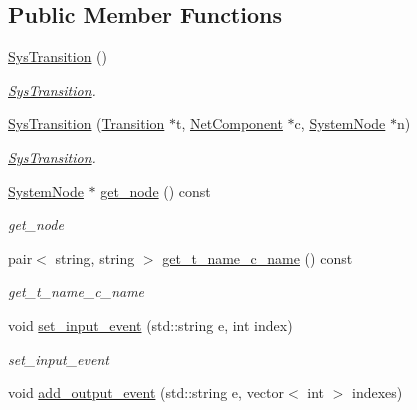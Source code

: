 \subsection*{Public Member Functions}
\begin{DoxyCompactItemize}
\item 
\hyperlink{class_sys_transition_a3918816e3e9b4e505f1b8db508832cfb}{Sys\+Transition} ()\hypertarget{class_sys_transition_a3918816e3e9b4e505f1b8db508832cfb}{}\label{class_sys_transition_a3918816e3e9b4e505f1b8db508832cfb}

\begin{DoxyCompactList}\small\item\em \hyperlink{class_sys_transition}{Sys\+Transition}. \end{DoxyCompactList}\item 
\hyperlink{class_sys_transition_aa79fd80b8a077838873db93662accc2c}{Sys\+Transition} (\hyperlink{class_transition}{Transition} $\ast$t, \hyperlink{class_net_component}{Net\+Component} $\ast$c, \hyperlink{class_system_node}{System\+Node} $\ast$n)
\begin{DoxyCompactList}\small\item\em \hyperlink{class_sys_transition}{Sys\+Transition}. \end{DoxyCompactList}\item 
\hyperlink{class_system_node}{System\+Node} $\ast$ \hyperlink{class_sys_transition_afc54d9b7708e2d80761e9fa99a6d1bfb}{get\+\_\+node} () const 
\begin{DoxyCompactList}\small\item\em get\+\_\+node \end{DoxyCompactList}\item 
pair$<$ string, string $>$ \hyperlink{class_sys_transition_a6ed437db199f6ccbd8578e1db305a221}{get\+\_\+t\+\_\+name\+\_\+c\+\_\+name} () const 
\begin{DoxyCompactList}\small\item\em get\+\_\+t\+\_\+name\+\_\+c\+\_\+name \end{DoxyCompactList}\item 
void \hyperlink{class_sys_transition_a6cd5c8bb1f39370c8c4552cea193caf0}{set\+\_\+input\+\_\+event} (std\+::string e, int index)
\begin{DoxyCompactList}\small\item\em set\+\_\+input\+\_\+event \end{DoxyCompactList}\item 
void \hyperlink{class_sys_transition_a6a04aa7872a8d891d085764bca41c9cd}{add\+\_\+output\+\_\+event} (std\+::string e, vector$<$ int $>$ indexes)

\end{DoxyCompactItemize}
